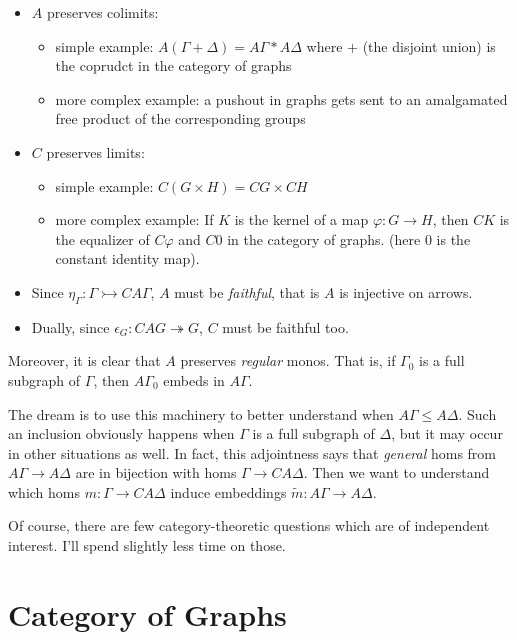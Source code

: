 \documentclass[12pt]{article}
\theoremstyle{definition}
\newcommand{\monor}{\rightarrowtail}
\newcommand{\epir}{\twoheadrightarrow}
\begin{document}
\begin{itemize}
  \item $A$ preserves colimits:
    \begin{itemize}
      \item simple example: 
        $A(\Gamma + \Delta) = A\Gamma \ast A\Delta$ 
        where $+$ (the disjoint union) is the coprudct in the category of graphs
      \item more complex example: a pushout in graphs gets sent to an 
        amalgamated free product of the corresponding groups
    \end{itemize}
  \item $C$ preserves limits:
    \begin{itemize}
      \item simple example: $C(G \times H) = CG \times CH$
      \item more complex example: 
        If $K$ is the kernel of a map $\varphi : G \to H$,
        then $CK$ is the equalizer of $C\varphi$ and $C0$ 
        in the category of graphs. (here $0$ is the constant identity map).
    \end{itemize}
  \item Since $\eta_\Gamma : \Gamma \monor CA\Gamma$, $A$ must be \emph{faithful}, 
    that is $A$ is injective on arrows.
  \item Dually, since $\epsilon_G : CAG \epir G$, $C$ must be faithful too.
\end{itemize}

Moreover, it is clear that $A$ preserves \emph{regular} monos. That is,
if $\Gamma_0$ is a full subgraph of $\Gamma$, then $A\Gamma_0$ embeds in
$A\Gamma$.

The dream is to use this machinery to better understand when 
$A\Gamma \leq A\Delta$. Such an inclusion obviously happens when 
$\Gamma$ is a full subgraph of $\Delta$, but it may occur in other situations 
as well. In fact, this adjointness says that \emph{general} homs from
$A\Gamma \to A\Delta$ are in bijection with homs $\Gamma \to CA\Delta$. 
Then we want to understand which homs $m : \Gamma \to CA\Delta$ induce 
embeddings $\widetilde{m} : A\Gamma \to A\Delta$.

Of course, there are few category-theoretic questions which are of
independent interest. I'll spend slightly less time on those.

\section{Category of Graphs}
\end{document}
